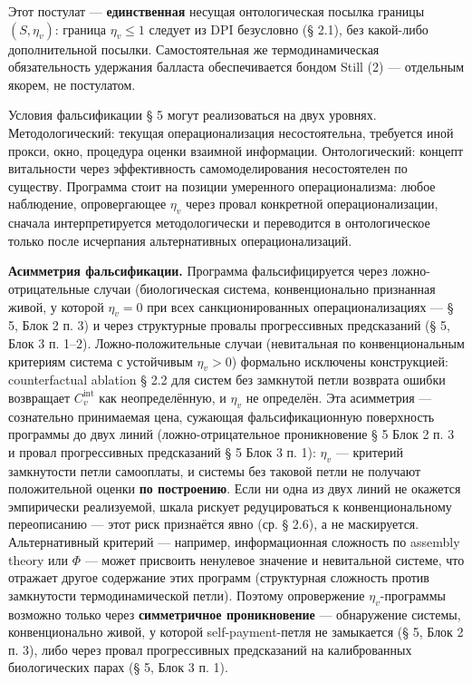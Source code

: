 \documentclass[pdflatex,sn-mathphys-ay]{sn-jnl}
\begin{document}
Этот постулат --- \textbf{единственная} несущая онтологическая посылка границы \((S, \eta_v)\): граница \(\eta_v \le 1\) следует из DPI безусловно (§ 2.1), без какой-либо дополнительной посылки. Самостоятельная же термодинамическая обязательность удержания балласта обеспечивается бондом Still (2) --- отдельным якорем, не постулатом.

Условия фальсификации § 5 могут реализоваться на двух уровнях. Методологический: текущая операционализация несостоятельна, требуется иной прокси, окно, процедура оценки взаимной информации. Онтологический: концепт витальности через эффективность самомоделирования несостоятелен по существу. Программа стоит на позиции умеренного операционализма: любое наблюдение, опровергающее \(\eta_v\) через провал конкретной операционализации, сначала интерпретируется методологически и переводится в онтологическое только после исчерпания альтернативных операционализаций.

\textbf{Асимметрия фальсификации.} Программа фальсифицируется через ложно-отрицательные случаи (биологическая система, конвенционально признанная живой, у которой \(\eta_v = 0\) при всех санкционированных операционализациях --- § 5, Блок 2 п. 3) и через структурные провалы прогрессивных предсказаний (§ 5, Блок 3 п. 1--2). Ложно-положительные случаи (невитальная по конвенциональным критериям система с устойчивым \(\eta_v > 0\)) формально исключены конструкцией: counterfactual ablation § 2.2 для систем без замкнутой петли возврата ошибки возвращает \(C_v^{\text{int}}\) как неопределённую, и \(\eta_v\) не определён. Эта асимметрия --- сознательно принимаемая цена, сужающая фальсификационную поверхность программы до двух линий (ложно-отрицательное проникновение § 5 Блок 2 п. 3 и провал прогрессивных предсказаний § 5 Блок 3 п. 1): \(\eta_v\) --- критерий замкнутости петли самооплаты, и системы без таковой петли не получают положительной оценки \textbf{по построению}. Если ни одна из двух линий не окажется эмпирически реализуемой, шкала рискует редуцироваться к конвенциональному переописанию --- этот риск признаётся явно (ср. § 2.6), а не маскируется. Альтернативный критерий --- например, информационная сложность по assembly theory или \(\Phi\) --- может присвоить ненулевое значение и невитальной системе, что отражает другое содержание этих программ (структурная сложность против замкнутости термодинамической петли). Поэтому опровержение \(\eta_v\)-программы возможно только через \textbf{симметричное проникновение} --- обнаружение системы, конвенционально живой, у которой self-payment-петля не замыкается (§ 5, Блок 2 п. 3), либо через провал прогрессивных предсказаний на калиброванных биологических парах (§ 5, Блок 3 п. 1).
\end{document}
